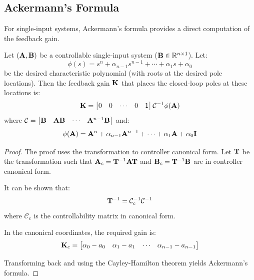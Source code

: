 \subsection{Ackermann's Formula}

For single-input systems, Ackermann's formula provides a direct computation of the feedback gain.

\begin{theorem}
\label{thm:ackermann}
Let $(\mathbf{A}, \mathbf{B})$ be a controllable single-input system ($\mathbf{B} \in \mathbb{R}^{n \times 1}$). Let:
\begin{equation}
\phi(s) = s^n + \alpha_{n-1}s^{n-1} + \cdots + \alpha_1 s + \alpha_0
\end{equation}
be the desired characteristic polynomial (with roots at the desired pole locations). Then the feedback gain $\mathbf{K}$ that places the closed-loop poles at these locations is:
\begin{equation}
\mathbf{K} = \begin{bmatrix} 0 & 0 & \cdots & 0 & 1 \end{bmatrix} \mathcal{C}^{-1} \phi(\mathbf{A})
\label{eq:ackermann}
\end{equation}
where $\mathcal{C} = \begin{bmatrix} \mathbf{B} & \mathbf{A}\mathbf{B} & \cdots & \mathbf{A}^{n-1}\mathbf{B} \end{bmatrix}$ and:
\begin{equation}
\phi(\mathbf{A}) = \mathbf{A}^n + \alpha_{n-1}\mathbf{A}^{n-1} + \cdots + \alpha_1\mathbf{A} + \alpha_0\mathbf{I}
\end{equation}
\end{theorem}

\begin{proof}
The proof uses the transformation to controller canonical form. Let $\mathbf{T}$ be the transformation such that $\mathbf{A}_c = \mathbf{T}^{-1}\mathbf{A}\mathbf{T}$ and $\mathbf{B}_c = \mathbf{T}^{-1}\mathbf{B}$ are in controller canonical form.

It can be shown that:
\begin{equation}
\mathbf{T}^{-1} = \mathcal{C}_c^{-1}\mathcal{C}^{-1}
\end{equation}
where $\mathcal{C}_c$ is the controllability matrix in canonical form.

In the canonical coordinates, the required gain is:
\begin{equation}
\mathbf{K}_c = \begin{bmatrix} \alpha_0 - a_0 & \alpha_1 - a_1 & \cdots & \alpha_{n-1} - a_{n-1} \end{bmatrix}
\end{equation}

Transforming back and using the Cayley-Hamilton theorem yields Ackermann's formula.
\end{proof}

